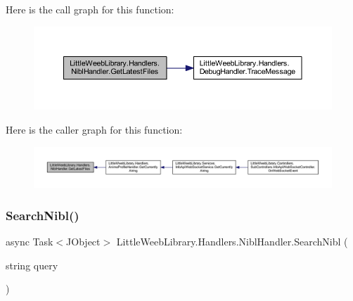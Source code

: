 Here is the call graph for this function\+:\nopagebreak
\begin{figure}[H]
\begin{center}
\leavevmode
\includegraphics[width=350pt]{class_little_weeb_library_1_1_handlers_1_1_nibl_handler_a20fef31afe52976e394fc44659cc3593_cgraph}
\end{center}
\end{figure}
Here is the caller graph for this function\+:\nopagebreak
\begin{figure}[H]
\begin{center}
\leavevmode
\includegraphics[width=350pt]{class_little_weeb_library_1_1_handlers_1_1_nibl_handler_a20fef31afe52976e394fc44659cc3593_icgraph}
\end{center}
\end{figure}
\mbox{\label{class_little_weeb_library_1_1_handlers_1_1_nibl_handler_aa5fcae94d3322123b784078727a3db67}} 
\subsubsection{\texorpdfstring{Search\+Nibl()}{SearchNibl()}\hspace{0.1cm}{\footnotesize\ttfamily [1/2]}}
{\footnotesize\ttfamily async Task$<$J\+Object$>$ Little\+Weeb\+Library.\+Handlers.\+Nibl\+Handler.\+Search\+Nibl (\begin{DoxyParamCaption}\item[{string}]{query }\end{DoxyParamCaption})}




